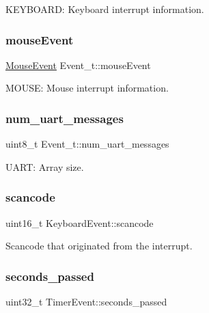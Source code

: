 K\+E\+Y\+B\+O\+A\+RD\+: Keyboard interrupt information. 

\mbox{\label{group__event_ga0cf4f0e41d1890283cf4ac717a7caee7}} 
\subsubsection{\texorpdfstring{mouse\+Event}{mouseEvent}}
{\footnotesize\ttfamily \mbox{\hyperlink{struct_mouse_event}{Mouse\+Event}} Event\+\_\+t\+::mouse\+Event}



M\+O\+U\+SE\+: Mouse interrupt information. 

\mbox{\label{group__event_ga06510bc0368c992c639e98d32ddf1f08}} 
\subsubsection{\texorpdfstring{num\+\_\+uart\+\_\+messages}{num\_uart\_messages}}
{\footnotesize\ttfamily uint8\+\_\+t Event\+\_\+t\+::num\+\_\+uart\+\_\+messages}



U\+A\+RT\+: Array size. 

\mbox{\label{group__event_gad4aa052be4d1b19f7729750811c00938}} 
\subsubsection{\texorpdfstring{scancode}{scancode}}
{\footnotesize\ttfamily uint16\+\_\+t Keyboard\+Event\+::scancode}



Scancode that originated from the interrupt. 

\mbox{\label{group__event_gafb71fa98ff8d281a1007a43b7235bf6e}} 
\subsubsection{\texorpdfstring{seconds\+\_\+passed}{seconds\_passed}}
{\footnotesize\ttfamily uint32\+\_\+t Timer\+Event\+::seconds\+\_\+passed}



